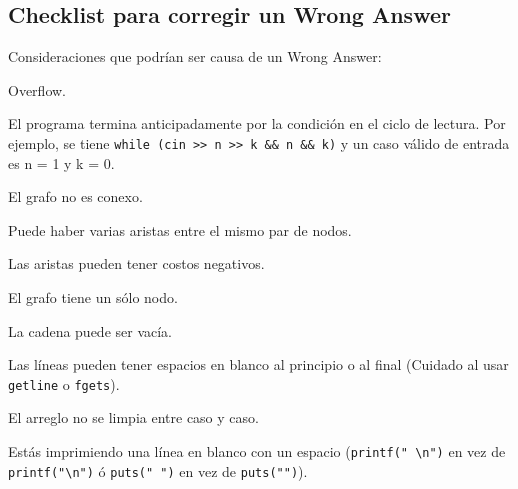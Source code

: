 \documentclass[10pt,letterpaper,twocolumn,twosided]{article}
\begin{document}
\subsection{Checklist para corregir un Wrong Answer}
Consideraciones que podrían ser causa de un Wrong Answer:
\begin{itemize}
  \begin{item}
    Overflow.
  \end{item}

  \begin{item}
    El programa termina anticipadamente por la condición en el ciclo de lectura.
    Por ejemplo, se tiene \verb_while (cin >> n >> k && n && k)_ y un caso válido de entrada
    es n = 1 y k = 0.
  \end{item}

  \begin{item}
    El grafo no es conexo.
  \end{item}

  \begin{item}
    Puede haber varias aristas entre el mismo par de nodos.
  \end{item}

  \begin{item}
    Las aristas pueden tener costos negativos.
  \end{item}

  \begin{item}
    El grafo tiene un sólo nodo.
  \end{item}

  \begin{item}
    La cadena puede ser vacía.
  \end{item}

  \begin{item}
    Las líneas pueden tener espacios en blanco al principio o al final (Cuidado al usar \texttt{getline} o \texttt{fgets}).
  \end{item}

  \begin{item}
    El arreglo no se limpia entre caso y caso.
  \end{item}

  \begin{item}
    Estás imprimiendo una línea en blanco con un espacio (\verb_printf(" \n")_ en vez de \verb_printf("\n")_  ó \verb_puts(" ")_  en vez de \verb_puts("")_).
  \end{item}



\end{itemize}
\end{document}
